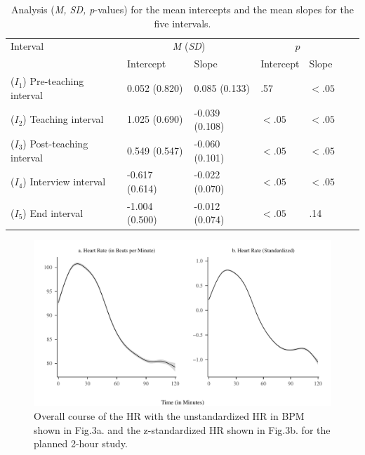\documentclass[preprint,
3p]{elsarticle} %
\begin{document}
\renewcommand{\arraystretch}{1.5} 

\begin{table}[ht]
    \centering
    \begin{tabularx}{\textwidth}{lXXXXXX}
        \toprule
        Interval  & \multicolumn{2}{c}{\textit{M} (\textit{SD})} & \multicolumn{2}{c}{$p$} \\ & Intercept & Slope & Intercept & Slope \\
        \midrule
        ($I_1$) Pre-teaching interval & 0.052 (0.820) & 0.085 (0.133) & .57 & $< .05$ \\
        ($I_2$) Teaching interval & 1.025 (0.690) & -0.039 (0.108) & $< .05$ & $< .05$ \\
        ($I_3$) Post-teaching interval & 0.549 (0.547) & -0.060 (0.101) & $< .05$ & $< .05$ \\
        ($I_4$) Interview interval & -0.617 (0.614) & -0.022 (0.070) & $< .05$ & $< .05$ \\
        ($I_5$) End interval & -1.004 (0.500) & -0.012 (0.074) & $< .05$ & .14 \\
        \bottomrule
    \end{tabularx}
    \caption{Analysis (\textit{M, SD, p}-values) for the mean intercepts and the mean slopes for the five intervals.}
    \label{tab_2}
\end{table}

\begin{figure}[H]
  \centering
  \includegraphics[width=1\textwidth]{plots_publication/loess_plot_std_unstd_new.pdf}
  \caption{Overall course of the HR with the unstandardized HR in BPM shown in Fig.3a. and the z-standardized HR shown in Fig.3b. for the planned 2-hour study.}
  \label{fig.3}
\end{figure}
\end{document}
